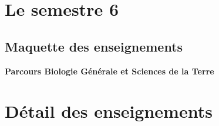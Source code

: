 \documentclass[10pt, a5paper]{report}
\begin{document}
\begin{spacing}{1.5}
\footnotesize

\section*{Le semestre 6}

\subsection*{Maquette des enseignements}

\textbf{Parcours Biologie Générale et Sciences de la Terre}
\newline



\section*{Détail des enseignements}

\end{spacing}
\end{document}
